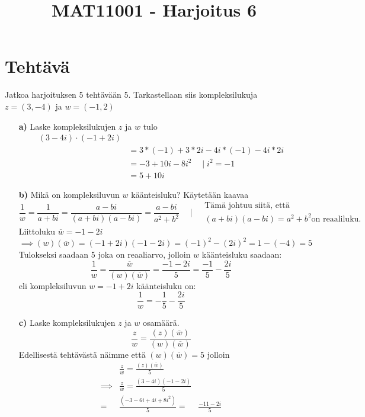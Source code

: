 \documentclass{article}
\newcounter{tehtava}
\begin{document}
    \thispagestyle{plain}
	\title{MAT11001 - Harjoitus 6}
	\date{}
	\maketitle
	
	
	\section*{Tehtävä \thetehtava}
    Jatkoa harjoituksen 5 tehtävään 5. Tarkastellaan siis kompleksilukuja $z = (3, -4)$ ja $w =(-1, 2)$
    \begin{itemize}
        \item[\textbf{a)}] Laske kompleksilukujen $z$ ja $w$ tulo
        \[
        \begin{aligned}    
            (3-4i) \cdot (-1+2i)& \\
            &= 3*(-1) + 3*2i -4i*(-1) -4i*2i \\
            &= -3 + 10i -8i^2 \quad \mid i^2 = -1 \\
            &= 5 + 10i
        \end{aligned}
        \]
        \item[\textbf{b)}] Mikä on kompleksiluvun $w$ käänteisluku? \newline
        Käytetään kaavaa
        \[
            \frac{1}{w} = \frac{1}{a + bi} = \frac{a - bi}{(a + bi)(a - bi)} = \frac{a - bi}{a^2 + b^2}
                \quad \mid
                \begin{aligned}
                &\text{Tämä johtuu siitä, että } \\ &(a + bi)(a - bi) = a^2 + b^2
                \text{on reaaliluku.}
                \end{aligned}
        \]
        Liittoluku $\overline{w} = -1 - 2i$\newline
        $\implies (w)(\overline{w}) = (-1 + 2i)(-1 - 2i) = (-1)^2 - (2i)^2 = 1 - (-4) = 5$\newline
        Tulokseksi saadaan 5 joka on reaaliarvo, jolloin $w$ käänteisluku saadaan:\newline
        \[
        \frac{1}{w} = \frac{\overline{w}}{(w)(\overline{w})} = \frac{-1 - 2i}{5} = \frac{-1}{5} - \frac{2i}{5}
        \]
        eli kompleksiluvun $w = -1 + 2i$ käänteisluku on:
        \[
            \frac{1}{w} = -\frac{1}{5} - \frac{2i}{5}
        \]
\pagebreak
        \item[\textbf{c)}] Laske kompleksilukujen $z$ ja $w$ osamäärä.\newline
        \[
            \frac{z}{w} = \frac{(z)(\overline{w})}{(w)(\overline{w})}
        \]
        Edellisestä tehtävästä näimme että $(w)(\overline{w}) = 5$ jolloin
        \[
        \begin{aligned}
            & \frac{z}{w} = \frac{(z)(\overline{w})}{5} \\
            \implies & \frac{z}{w} = \frac{(3-4i)(-1-2i)}{5} \\
            = & \frac{(-3 -6i +4i + 8i^2)}{5}
            = & \frac{-11 -2i}{5}
        \end{aligned}
        \]
    \end{itemize}
\end{document}
